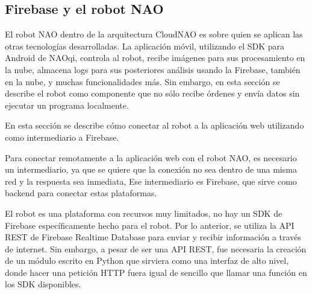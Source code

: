 \subsection{Firebase y el robot NAO}\label{\detokenize{firebase-nao-robot}}
El robot NAO dentro de la arquitectura CloudNAO es sobre quien se aplican las
otras tecnologías desarrolladas. La aplicación móvil, utilizando el SDK para Android de NAOqi,
controla al robot, recibe imágenes para sus procesamiento en la nube, almacena
logs para sus posteriores análisis usando la Firebase, también en la nube, y muchas
funcionalidades más. Sin embargo, en esta sección se describe el robot como componente
que no sólo recibe órdenes y envía datos sin ejecutar un programa localmente.


En esta sección se describe cómo conectar al robot a la aplicación web utilizando
como intermediario a Firebase.

Para conectar remotamente a la aplicación web con el robot NAO, es necesario
un intermediario, ya que se quiere que la conexión no sea dentro de una misma red
y la respuesta sea inmediata, Ese intermediario es Firebase, que sirve como
backend para conectar estas plataformas.

El robot es una plataforma con recursos muy limitados, no hay un SDK
de Firebase
específicamente hecho para el robot. Por lo anterior, se utiliza la API REST
de Firebase Realtime Database para enviar y recibir información a través de
internet. Sin embargo, a pesar de ser una API REST, fue necesaria la creación
de un módulo escrito en Python que sirviera como una interfaz de alto nivel,
donde hacer una petición HTTP fuera igual de sencillo que llamar una función en
los SDK disponibles.



